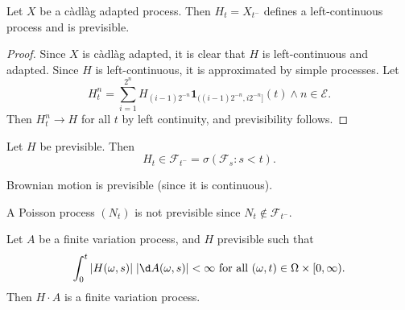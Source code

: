 \documentclass[a4paper]{article}
\begin{document}
\begin{fact}
  Let $X$ be a c\`adl\`ag adapted process. Then $H_t = X_{t^-}$ defines a left-continuous process and is previsible.
\end{fact}

\begin{proof}
  Since $X$ is c\`adl\`ag adapted, it is clear that $H$ is left-continuous and adapted. Since $H$ is left-continuous, it is approximated by simple processes. Let
  \[
    H_t^n = \sum_{i = 1}^{2^n} H_{(i - 1)2^{-n}} \mathbf{1}_{((i - 1)2^{-n}, i 2^{-n}]} (t) \wedge n \in \mathcal{E}.
  \]
  Then $H_t^n \to H$ for all $t$ by left continuity, and previsibility follows.
\end{proof}

\begin{ex}
  Let $H$ be previsible. Then
  \[
    H_t \in \mathcal{F}_{t^-} = \sigma(\mathcal{F}_s : s < t).
  \]
\end{ex}

\begin{eg}
  Brownian motion is previsible (since it is continuous).
\end{eg}

\begin{eg}
  A Poisson process $(N_t)$ is not previsible since $N_t \not \in \mathcal{F}_{t^-}$.
\end{eg}

\begin{prop}
  Let $A$ be a finite variation process, and $H$ previsible such that
  \[
    \int_0^t |H(\omega, s)|\;|\d A(\omega, s)| < \infty\text{ for all }(\omega, t) \in \Omega \times [0, \infty).
  \]
  Then $H \cdot A$ is a finite variation process.
\end{prop}
\end{document}
